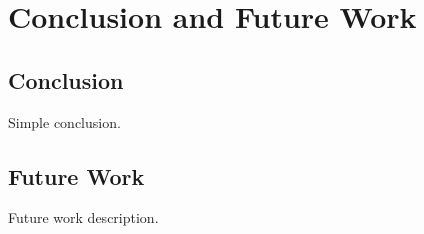 \chapter{Conclusion and Future Work}
\label{Conclusion}

\section{Conclusion}

Simple conclusion.

\section{Future Work}

Future work description.